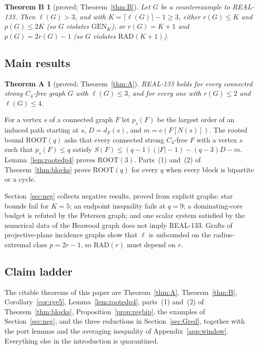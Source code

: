 \documentclass[11pt]{amsart}
\newtheorem*{theoremA}{Theorem A}
\newtheorem*{theoremB}{Theorem B}
\theoremstyle{definition}
\theoremstyle{remark}
\newcommand{\lr}{\ell}
\newcommand{\pp}{p}
\newcommand{\GEN}{\mathrm{GEN}}
\newcommand{\RAD}{\mathrm{RAD}}
\newcommand{\ROOT}{\mathrm{ROOT}}
\begin{document}
\begin{theoremB}[proved; Theorem~\ref{thm:B}]
Let $G$ be a counterexample to REAL-133. Then $\lr(G)>3$, and with $K=\lceil\lr(G)\rceil-1\ge3$, either $r(G)\le K$ and $\pp(G)\le2K$ \textup{(}so $G$ violates $\GEN_K$\textup{)}, or $r(G)=K+1$ and $\pp(G)=2r(G)-1$ \textup{(}so $G$ violates $\RAD(K+1)$\textup{)}.
\end{theoremB}

\subsection*{Main results}

\begin{theoremA}[proved; Theorem~\ref{thm:A}]
REAL-133 holds for every connected strong $C_4$-free graph $G$ with $\lr(G)\le3$, and for every one with $r(G)\le2$ and $\lr(G)\le 4$.
\end{theoremA}

For a vertex $s$ of a connected graph $F$ let $\pp_s(F)$ be the largest order of an induced path starting at $s$, $D=d_F(s)$, and $m=e(F[N(s)])$. The rooted bound $\ROOT(q)$ asks that every connected strong $C_4$-free $F$ with a vertex $s$ such that $\pp_s(F)\le q$ satisfy $S(F)\le(q-1)(|F|-1)-(q-3)D-m$. Lemma~\ref{lem:rootedp4} proves $\ROOT(3)$. Parts~(1) and~(2) of Theorem~\ref{thm:blocks} prove $\ROOT(q)$ for every $q$ when every block is bipartite or a cycle.

Section~\ref{sec:neg} collects negative results, proved from explicit graphs: star bounds fail for $K=5$; an endpoint inequality fails at $q=9$; a dominating-core budget is refuted by the Petersen graph; and one scalar system satisfied by the numerical data of the Heawood graph does not imply REAL-133. Grafts of projective-plane incidence graphs show that $\lr$ is unbounded on the radius-extremal class $\pp=2r-1$, so $\RAD(r)$ must depend on $r$.

\subsection*{Claim ladder}
The citable theorems of this paper are Theorem~\ref{thm:A}, Theorem~\ref{thm:B}, Corollary~\ref{cor:rge5}, Lemma~\ref{lem:rootedp4}, parts~(1) and~(2) of Theorem~\ref{thm:blocks}, Proposition~\ref{prop:regbip}, the examples of Section~\ref{sec:neg}, and the three reductions in Section~\ref{sec:Gred}, together with the port lemmas and the averaging inequality of Appendix~\ref{app:window}. Everything else in the introduction is quarantined.
\end{document}
